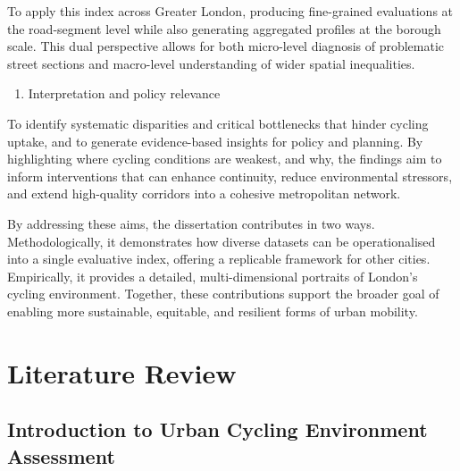 \documentclass[
  12pt,
  oneside]{book}
\providecommand{\tightlist}{%
  \setlength{\itemsep}{0pt}\setlength{\parskip}{0pt}}
\begin{document}
To apply this index across Greater London, producing fine-grained evaluations at the road-segment level while also generating aggregated profiles at the borough scale. This dual perspective allows for both micro-level diagnosis of problematic street sections and macro-level understanding of wider spatial inequalities.

\begin{enumerate}
\def\labelenumi{\arabic{enumi}.}
\setcounter{enumi}{2}
\tightlist
\item
  Interpretation and policy relevance
\end{enumerate}

To identify systematic disparities and critical bottlenecks that hinder cycling uptake, and to generate evidence-based insights for policy and planning. By highlighting where cycling conditions are weakest, and why, the findings aim to inform interventions that can enhance continuity, reduce environmental stressors, and extend high-quality corridors into a cohesive metropolitan network.

By addressing these aims, the dissertation contributes in two ways. Methodologically, it demonstrates how diverse datasets can be operationalised into a single evaluative index, offering a replicable framework for other cities. Empirically, it provides a detailed, multi-dimensional portraits of London's cycling environment. Together, these contributions support the broader goal of enabling more sustainable, equitable, and resilient forms of urban mobility.

\chapter{Literature Review}\label{literature-review}

\section{Introduction to Urban Cycling Environment Assessment}\label{introduction-to-urban-cycling-environment-assessment}
\end{document}

